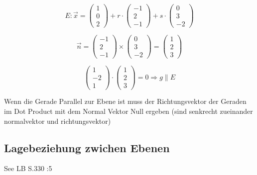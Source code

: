 \documentclass{article}
\begin{document}
\begin{equation}
	E : \overrightarrow{x} = \begin{pmatrix}1\\0\\2\end{pmatrix} + r \cdot \begin{pmatrix}-1\\2\\-1\end{pmatrix} + s \cdot \begin{pmatrix}0\\3\\-2\end{pmatrix}
\end{equation}

\begin{equation}
 \overrightarrow{n} = \begin{pmatrix}-1\\2\\-1\end{pmatrix} \times  \begin{pmatrix}0\\3\\-2\end{pmatrix} =  \begin{pmatrix}1\\2\\3\end{pmatrix}
\end{equation}
	
\begin{equation}
	\begin{pmatrix}1\\-2\\1\end{pmatrix} \cdot \begin{pmatrix}1\\2\\3\end{pmatrix} = 0 \Rightarrow g \parallel E
\end{equation}

Wenn die Gerade Parallel zur Ebene ist muss der Richtungsvektor der Geraden im Dot Product mit dem Normal Vektor Null ergeben (sind senkrecht zueinander normalvektor und richtungsvektor)

\subsection*{Lagebeziehung zwichen Ebenen}
See LB S.330 :5
\end{document}
